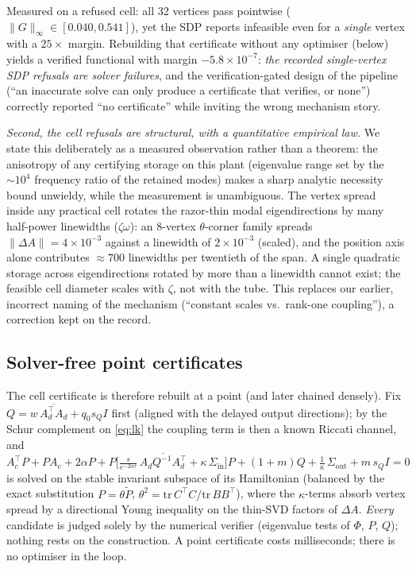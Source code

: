 \documentclass[preprint,12pt]{elsarticle}
\begin{document}
Measured on a refused
cell: all 32 vertices pass pointwise ($\|G\|_\infty \in
[0.040, 0.541]$), yet the SDP reports infeasible even for a
\emph{single} vertex with a $25\times$ margin.  Rebuilding that
certificate without any optimiser (below) yields a verified functional
with margin $-5.8\times10^{-7}$: \emph{the recorded single-vertex SDP
refusals are solver failures}, and the verification-gated design of the
pipeline (``an inaccurate solve can only produce a certificate that
verifies, or none'') correctly reported ``no certificate'' while
inviting the wrong mechanism story.

\emph{Second, the cell refusals are structural, with a quantitative
empirical law.}  We state this deliberately as a measured observation
rather than a theorem: the anisotropy of any certifying storage on
this plant (eigenvalue range set by the $\sim\!10^4$ frequency ratio
of the retained modes) makes a sharp analytic necessity bound
unwieldy, while the measurement is unambiguous.  The vertex spread
inside any practical cell rotates the
razor-thin modal eigendirections by many half-power linewidths
($\zeta\omega$): an 8-vertex $\theta$-corner family spreads
$\|\Delta A\| = 4\times10^{-3}$ against a linewidth of
$2\times10^{-3}$ (scaled), and the position axis alone contributes
$\approx 700$ linewidths per twentieth of the span.  A single quadratic
storage across eigendirections rotated by more than a linewidth cannot
exist; the feasible cell diameter scales with $\zeta$, not with the
tube.  This replaces our earlier, incorrect naming of the mechanism
(``constant scales vs.\ rank-one coupling''), a correction kept on the
record.

\subsection{Solver-free point certificates}

The cell certificate is therefore rebuilt at a point (and later chained
densely).  Fix $Q = w\,\overline{A_d^{\!\top} A_d} + q_0 s_Q I$ first
(aligned with the delayed output directions); by the Schur complement
on \eqref{eq:lk} the coupling term is then a known Riccati channel, and
\begin{equation}
A_c^{\!\top} P + P A_c + 2\alpha P
+ P \Big[\tfrac{s}{e^{-2\alpha\tau}}\,
\overline{A_d Q^{-1} A_d^{\!\top}} + \kappa\, \Sigma_{\mathrm{in}}
\Big] P + (1{+}m) Q + \tfrac{1}{\kappa}\,\Sigma_{\mathrm{out}}
+ m\, s_Q I = 0
\label{eq:ric}
\end{equation}
is solved on the stable invariant subspace of its Hamiltonian
(balanced by the exact substitution $P = \theta \tilde P$,
$\theta^2 = \mathrm{tr}\,C^{\!\top}C / \mathrm{tr}\,BB^{\!\top}$),
where the $\kappa$-terms absorb vertex spread by a directional Young
inequality on the thin-SVD factors of $\Delta A$.  \emph{Every}
candidate is judged solely by the numerical verifier (eigenvalue tests
of $\Phi$, $P$, $Q$); nothing rests on the construction.  A point
certificate costs milliseconds; there is no optimiser in the loop.
\end{document}
